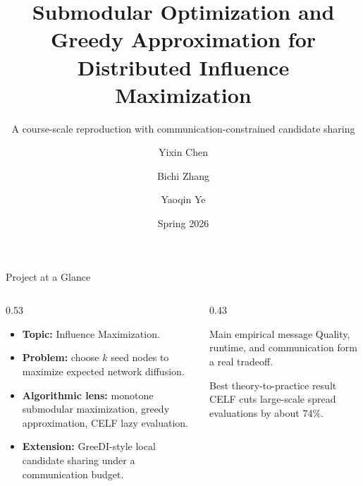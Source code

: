 \documentclass[10pt, aspectratio=169]{beamer}
\title[Distributed Influence Maximization]{Submodular Optimization and Greedy Approximation for Distributed Influence Maximization}
\subtitle{A course-scale reproduction with communication-constrained candidate sharing}
\author{Yixin Chen \and Bichi Zhang \and Yaoqin Ye}
\institute{CS240: Algorithm Design and Analysis}
\date{Spring 2026}
\newcommand{\metricbox}[2]{%
    \begin{block}{#1}
        \centering\Large #2
    \end{block}
}
\begin{document}
\begin{frame}
    \titlepage
\end{frame}

\begin{frame}{Project at a Glance}
    \begin{columns}[T,onlytextwidth]
        \begin{column}{0.53\linewidth}
            \begin{itemize}
                \item \textbf{Topic:} Influence Maximization.
                \item \textbf{Problem:} choose $k$ seed nodes to maximize expected network diffusion.
                \item \textbf{Algorithmic lens:} monotone submodular maximization, greedy approximation, CELF lazy evaluation.
                \item \textbf{Extension:} GreeDI-style local candidate sharing under a communication budget.
            \end{itemize}
        \end{column}
        \begin{column}{0.43\linewidth}
            \metricbox{Main empirical message}{Quality, runtime, and communication form a real tradeoff.}
            \metricbox{Best theory-to-practice result}{CELF cuts large-scale spread evaluations by about 74\%.}
        \end{column}
    \end{columns}
\end{frame}
\end{document}
